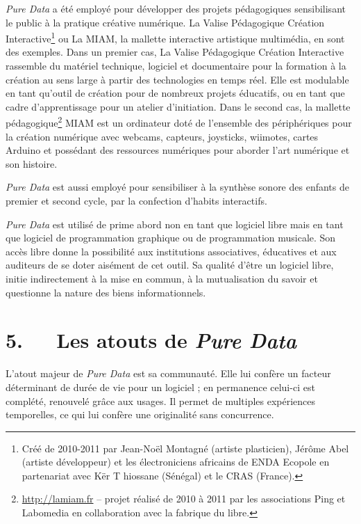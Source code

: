 \documentclass{FramateX}
\begin{document}
\begin{refsection}
\bigskip


\textit{Pure Data} a été employé pour développer des projets pédagogiques
sensibilisant le public à la pratique créative numérique. La Valise
Pédagogique Création Interactive\footnote{Créé de 2010-2011 par
Jean-Noël Montagné (artiste plasticien), Jérôme Abel (artiste
développeur) et les électroniciens africains de ENDA Ecopole en
partenariat avec Kër T hiossane (Sénégal) et le CRAS (France).} ou La
MIAM, la mallette interactive artistique multimédia, en sont des
exemples. Dans un premier cas, La Valise Pédagogique Création
Interactive rassemble du matériel technique, logiciel et documentaire
pour la formation à la création au sens large à partir des technologies
en temps réel. Elle est modulable en tant qu'outil de création pour de
nombreux projets éducatifs, ou en tant que cadre d'apprentissage pour
un atelier d'initiation. Dans le second cas, la mallette
pédagogique\footnote{\url{http://lamiam.fr} -- projet réalisé de 2010 à
2011 par les associations Ping et Labomedia en collaboration avec la
fabrique du libre.} MIAM est un ordinateur doté de l'ensemble des
périphériques pour la création numérique avec webcams, capteurs,
joysticks, wiimotes, cartes Arduino et possédant des ressources
numériques pour aborder l'art numérique et son histoire. 

\textit{Pure Data} est aussi employé pour sensibiliser à la synthèse sonore des
enfants de premier et second cycle, par la confection d'habits interactifs.

\textit{Pure Data} est utilisé de prime abord non en tant que logiciel libre mais
en tant que logiciel de programmation graphique ou de programmation
musicale. Son accès libre donne la possibilité aux institutions
associatives, éducatives et aux auditeurs de se doter aisément de cet
outil. Sa qualité d'être un logiciel libre, initie
indirectement à la mise en commun, à la mutualisation du savoir et
questionne la nature des biens informationnels.



\section*{5.~~~Les atouts de \textit{Pure Data}}
{}


L'atout majeur de \textit{Pure Data} est sa communauté. Elle lui
confère un facteur déterminant de durée de vie pour un logiciel ; en
permanence celui-ci est complété, renouvelé grâce aux usages. Il permet
de multiples expériences temporelles, ce qui lui confère une
originalité sans concurrence.


\end{refsection}
\end{document}
